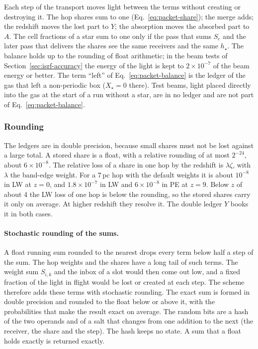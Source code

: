 Each step of the transport moves light between the terms without creating or
destroying it. The hop shares sum to one (Eq.~\eqref{eq:packet-share}); the
merge adds; the redshift moves the lost part to $Y$; the absorption moves the
absorbed part to $A$. The cell fractions of a star sum to one only if the
pass that sums $S_c$ and the later pass that delivers the shares see the same
receivers and the same $h_\star$. The balance holds up to the rounding of float
arithmetic; in the beam tests of Section~\ref{sec:isrf-accuracy} the energy of
the light is kept to $2\times10^{-7}$ of the beam energy or better. The term
``left'' of Eq.~\eqref{eq:packet-balance} is the ledger of the gas that left a
non-periodic box ($X_\star=0$ there). Test beams, light placed directly into
the gas at the start of a run without a star, are in no ledger and are not part
of Eq.~\eqref{eq:packet-balance}.

\subsubsection{Rounding}
\label{sec:isrf-rounding}

The ledgers are in double precision, because small shares must not be lost
against a large total. A stored share is a float, with a relative rounding of
at most $2^{-24}$, about $6\times10^{-8}$. The relative loss of a share in one
hop by the redshift is $\lambda\zeta$, with $\lambda$ the band-edge weight. For
a $7$\,pc hop with the default weights it is about $10^{-8}$ in LW at $z=0$,
and $1.8\times10^{-7}$ in LW and $6\times10^{-8}$ in PE at $z=9$. Below $z$ of
about 4 the LW loss of one hop is below the rounding, so the stored shares
carry it only on average. At higher redshift they resolve it. The double
ledger $Y$ books it in both cases.

\paragraph{Stochastic rounding of the sums.} A float running sum rounded to the
nearest drops every term below half a step of the sum. The hop weights and
the shares have a long tail of such terms. The weight sum $S_{i,k}$ and the
inbox of a slot would then come out low, and a fixed fraction of the light in
flight would be lost or created at each step. The scheme therefore adds these
terms with stochastic rounding. The exact sum is formed in double precision and
rounded to the float below or above it, with the probabilities that make the
result exact on average. The random bits are a hash of the two operands and of
a salt that changes from one addition to the next (the receiver, the share and
the step). The hash keeps no state. A sum that a float holds exactly is
returned exactly.

